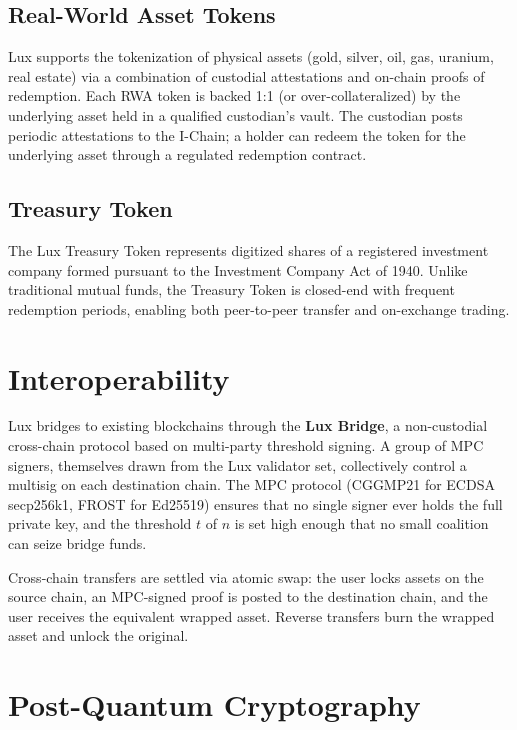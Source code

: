 \documentclass[11pt,a4paper]{article}
\begin{document}
\subsection{Real-World Asset Tokens}

Lux supports the tokenization of physical assets (gold, silver, oil,
gas, uranium, real estate) via a combination of custodial attestations
and on-chain proofs of redemption. Each RWA token is backed 1:1 (or
over-collateralized) by the underlying asset held in a qualified
custodian's vault. The custodian posts periodic attestations to the
I-Chain; a holder can redeem the token for the underlying asset
through a regulated redemption contract.

\subsection{Treasury Token}

The Lux Treasury Token represents digitized shares of a registered
investment company formed pursuant to the Investment Company Act
of 1940. Unlike traditional mutual funds, the Treasury Token is
closed-end with frequent redemption periods, enabling both
peer-to-peer transfer and on-exchange trading.

\section{Interoperability}

Lux bridges to existing blockchains through the \textbf{Lux Bridge},
a non-custodial cross-chain protocol based on multi-party threshold
signing. A group of MPC signers, themselves drawn from the Lux
validator set, collectively control a multisig on each destination
chain. The MPC protocol (CGGMP21 for ECDSA secp256k1, FROST for
Ed25519) ensures that no single signer ever holds the full
private key, and the threshold $t$ of $n$ is set high enough that
no small coalition can seize bridge funds.

Cross-chain transfers are settled via atomic swap: the user locks
assets on the source chain, an MPC-signed proof is posted to the
destination chain, and the user receives the equivalent wrapped
asset. Reverse transfers burn the wrapped asset and unlock the
original.

\section{Post-Quantum Cryptography}
\end{document}
